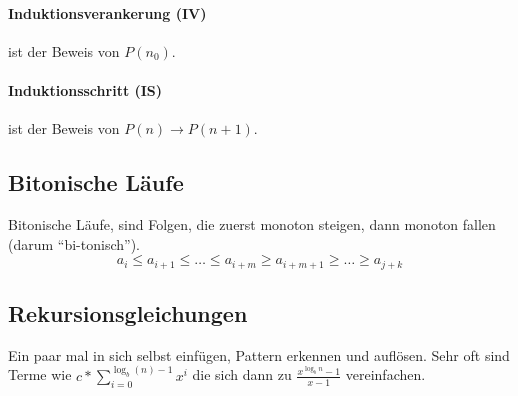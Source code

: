 \documentclass[a4paper, 9pt, DIV=20]{scrartcl}
\begin{document}
\paragraph{Induktionsverankerung (IV)} ist der Beweis von $P(n_0)$.

\paragraph{Induktionsschritt (IS)} ist der Beweis von $P(n) \rightarrow P(n+1)$.

\subsection{Bitonische Läufe}\label{bitonische_laufe}
Bitonische Läufe, sind Folgen, die zuerst monoton steigen, dann monoton fallen (darum ``bi-tonisch'').
 \[ a_i \leq a_{i+1} \leq \dots \leq a_{i+m} \geq a_{i+m+1} \geq \dots \geq a_{j+k} \]

\subsection{Rekursionsgleichungen}
Ein paar mal in sich selbst einfügen, Pattern erkennen und auflösen. Sehr oft sind Terme wie $\displaystyle c*\sum^{\log_b{(n)}-1}_{i=0}{x^i}$ die sich dann zu $\displaystyle\frac{x^{\log_b{n}}-1}{x-1}$ vereinfachen. 
\end{document}
